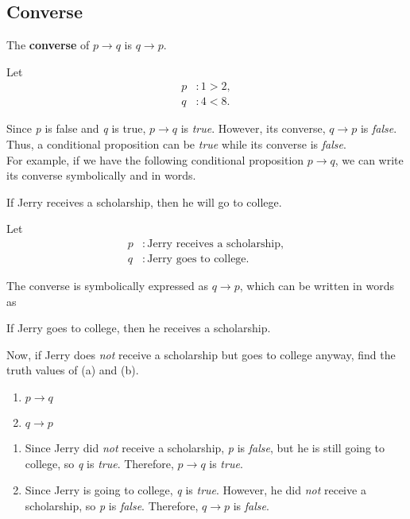 \subsection*{Converse}

The \textbf{converse} of $p \rightarrow q$ is $q \rightarrow p$.  

Let
\begin{align*}
p&: 1 > 2,\\
q&: 4 < 8.
\end{align*}

Since \textit{p} is false and \textit{q} is true, $p \rightarrow q$ is \textit{true}.  However, its converse, $q \rightarrow p$ is \textit{false}.  Thus, a conditional proposition can be \textit{true} while its converse is \textit{false}.\\

For example, if we have the following conditional proposition $p \rightarrow q$, we can write its converse symbolically and in words.
\begin{center}
If Jerry receives a scholarship, then he will go to college.
\end{center}

Let
\begin{align*}
p&: \text{Jerry receives a scholarship},\\
q&: \text{Jerry goes to college}.
\end{align*}

The converse is symbolically expressed as $q \rightarrow p$, which can be written in words as

\begin{center}
If Jerry goes to college, then he receives a scholarship.
\end{center}

Now, if Jerry does \textit{not} receive a scholarship but goes to college anyway, find the truth values of (a) and (b).
\begin{enumerate}[label=(\alph*)]
\item $p \rightarrow q$
\item $q \rightarrow p$
\end{enumerate}

\begin{enumerate}[label=(\alph*)]
\item Since Jerry did \textit{not} receive a scholarship, \textit{p} is \textit{false}, but he is still going to college, so \textit{q} is \textit{true}.  Therefore, $p \rightarrow q$ is \textit{true}.
\item Since Jerry is going to college, \textit{q} is \textit{true}.  However, he did \textit{not} receive a scholarship, so \textit{p} is \textit{false}.  Therefore, $q \rightarrow p$ is \textit{false}.
\end{enumerate}


